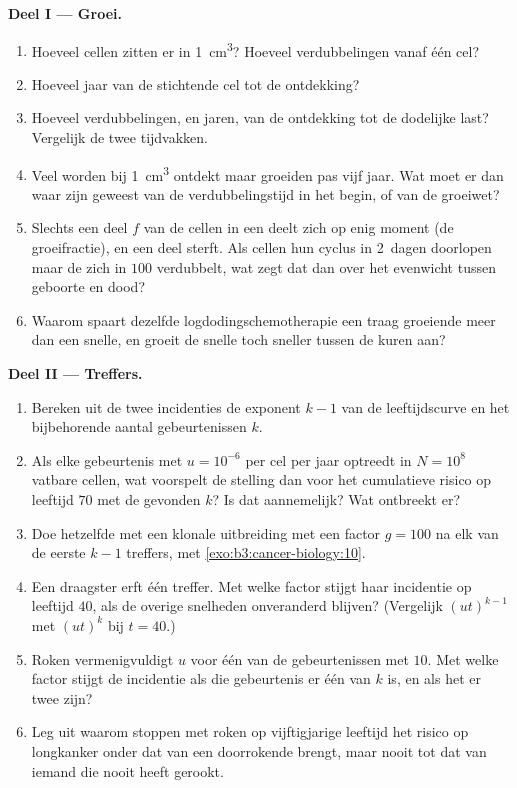 \begin{problem}
\medskip
\noindent\textbf{Deel I --- Groei.}
\begin{enumerate}
  \item Hoeveel cellen zitten er in \qty{1}{cm^3}? Hoeveel
        verdubbelingen vanaf één cel?
  \item Hoeveel jaar van de stichtende cel tot de ontdekking?
  \item Hoeveel verdubbelingen, en jaren, van de ontdekking tot de
        dodelijke last? Vergelijk de twee tijdvakken.
  \item Veel  worden bij \qty{1}{cm^3} ontdekt maar groeiden pas
        vijf jaar. Wat moet er dan waar zijn geweest van de
        verdubbelingstijd in het begin, of van de groeiwet?
  \item Slechts een deel $f$ van de cellen in een  deelt zich op
        enig moment (de groeifractie), en een deel sterft. Als cellen
        hun cyclus in \qty{2}{dagen} doorlopen maar de  zich in
        $100$ verdubbelt, wat zegt dat dan over het evenwicht tussen
        geboorte en dood?
  \item Waarom spaart dezelfde logdodingschemotherapie een traag
        groeiende  meer dan een snelle, en groeit de snelle toch
        sneller tussen de kuren aan?
\end{enumerate}

\medskip
\noindent\textbf{Deel II --- Treffers.}
\begin{enumerate}[resume]
  \item Bereken uit de twee incidenties de exponent $k - 1$ van de
        leeftijdscurve en het bijbehorende aantal gebeurtenissen $k$.
  \item Als elke gebeurtenis met $u = 10^{-6}$ per cel per jaar
        optreedt in $N = 10^{8}$ vatbare cellen, wat voorspelt de
        stelling dan voor het cumulatieve risico op leeftijd $70$ met
        de gevonden $k$? Is dat aannemelijk? Wat ontbreekt er?
  \item Doe hetzelfde met een klonale uitbreiding met een factor
        $g = 100$ na elk van de eerste $k - 1$ treffers, met
        \cref{exo:b3:cancer-biology:10}.
  \item Een draagster erft één treffer. Met welke factor stijgt haar
        incidentie op leeftijd $40$, als de overige snelheden
        onveranderd blijven? (Vergelijk $(ut)^{k-1}$ met $(ut)^{k}$ bij
        $t = 40$.)
  \item Roken vermenigvuldigt $u$ voor één van de gebeurtenissen met
        $10$. Met welke factor stijgt de incidentie als die gebeurtenis
        er één van $k$ is, en als het er twee zijn?
  \item Leg uit waarom stoppen met roken op vijftigjarige leeftijd het
        risico op longkanker onder dat van een doorrokende brengt, maar
        nooit tot dat van iemand die nooit heeft gerookt.
\end{enumerate}


\end{problem}
